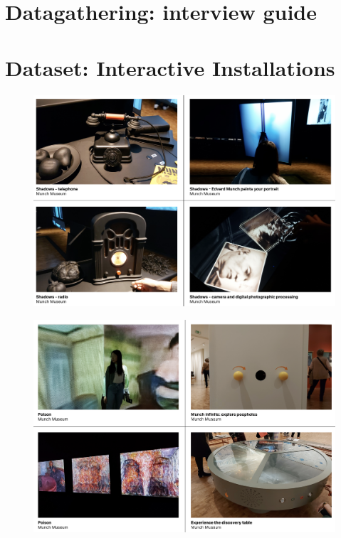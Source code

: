 \section{Datagathering: interview guide}
\section{Dataset: Interactive Installations}

\begin{figure}[H]
\includegraphics[width=13cm]{pictures/dataset/munch_1.png}
\centering 
\end{figure}

\begin{figure}[H]
\includegraphics[width=13cm]{pictures/dataset/munch_2.png}
\centering 
\end{figure}


